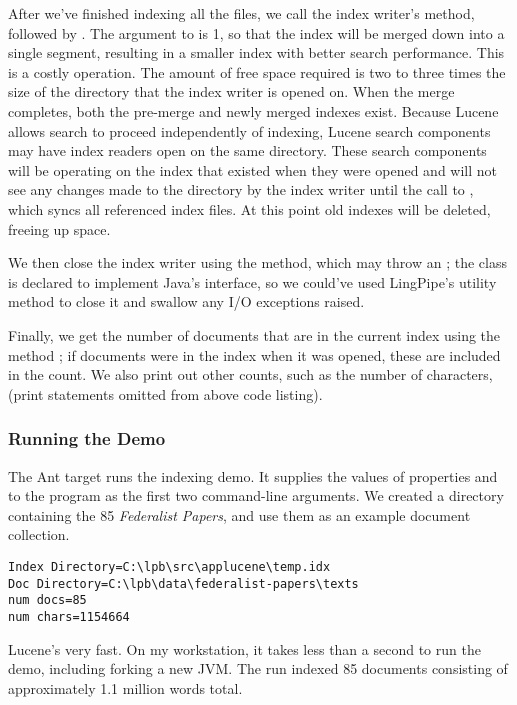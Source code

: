 After we've finished indexing all the files, we call the index
writer's  method, followed by .
The argument to  is 1, so that the index will be merged down
into a single segment, 
resulting in a smaller index with better search performance.  
This is a costly operation.
The amount of free space required is two to three times the size of
the directory that the index writer is opened on.
When the merge completes, both the pre-merge and newly merged indexes exist.
Because Lucene allows search to proceed independently of indexing,
Lucene search components may have index readers open on the same directory.
These search components will be operating on the index that existed when they were opened
and will not see any changes made to the directory by the index writer
until the call to , which syncs all referenced index files.
At this point old indexes will be deleted, freeing up space.

We then close the index
writer using the  method, which may throw an
; the  class is declared to
implement Java's  interface, so we could've used
LingPipe's  utility method to close it
and swallow any I/O exceptions raised.

Finally, we get the number of documents that are in the current index
using the method ; if documents were in the index when
it was opened, these are included in the count.  We also print out 
other counts, such as the number of characters, (print statements omitted
from above code listing).

\subsubsection{Running the Demo}

The Ant target  runs the indexing demo.  It
supplies the values of properties  and 
to the program as the first two command-line arguments.  We created a
directory containing the 85 {\it Federalist Papers}, and use them
as an example document collection.
%
\begin{verbatim}
Index Directory=C:\lpb\src\applucene\temp.idx
Doc Directory=C:\lpb\data\federalist-papers\texts
num docs=85
num chars=1154664
\end{verbatim}
%
Lucene's very fast.  On my workstation, it takes less than a second to
run the demo, including forking a new JVM.  The run indexed 85
documents consisting of approximately 1.1 million words total.

